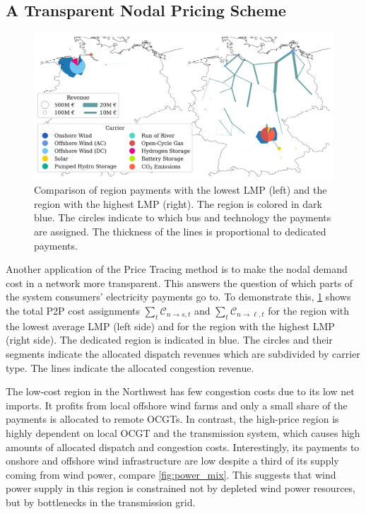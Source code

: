 \documentclass[11pt,twocolumn]{article}
\newcommand{\cost}{\mathcal{C}}
\newcommand{\allocategeneratorcost}[1][n \rightarrow s]{\cost_{#1, t}}
\newcommand{\allocatelinecost}[1][n \rightarrow \ell]{\cost_{#1, t}}
\begin{document}
\subsection{A Transparent Nodal Pricing Scheme}


\begin{figure}[h!]
    \includegraphics[width=\linewidth]{de50/allocated_payment_comparison}
    \caption{Comparison of region payments with the lowest \ac{LMP} (left) and the region with the highest \ac{LMP} (right). The region is colored in dark blue. The circles indicate to which bus and technology the payments are assigned. The thickness of the lines is proportional to dedicated payments.}
    \label{fig:direct-allocation}
\end{figure}

Another application of the Price Tracing method is to make the nodal demand cost in a network more transparent. This answers the question of which parts of the system consumers' electricity payments go to. To demonstrate this, \cref{fig:direct-allocation} shows the total \ac{P2P} cost assignments $\sum_t \allocategeneratorcost$ and $\sum_t  \allocatelinecost$ for the region with the lowest average \ac{LMP} (left side) and for the region with the highest \ac{LMP} (right side). The dedicated region is indicated in blue. The circles and their segments indicate the allocated dispatch revenues which are subdivided by carrier type. The lines indicate the allocated congestion revenue. 

The low-cost region in the Northwest has few congestion costs due to its low net imports. It profits from local offshore wind farms and only a small share of the payments is allocated to remote \acp{OCGT}. In contrast, the high-price region is highly dependent on local \ac{OCGT} and the transmission system, which causes high amounts of allocated dispatch and congestion costs. Interestingly, its payments to  onshore and offshore wind infrastructure are low despite a third of its supply coming from wind power, compare \cref{fig:power_mix}. This suggests that wind power supply in this region is constrained not by depleted wind power resources, but by bottlenecks in the transmission grid.  
\end{document}
